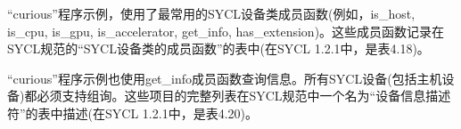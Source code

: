 “curious”程序示例，使用了最常用的SYCL设备类成员函数(例如，is\_host, is\_cpu, is\_gpu, is\_accelerator, get\_info, has\_extension)。这些成员函数记录在SYCL规范的“SYCL设备类的成员函数”的表中(在SYCL 1.2.1中，是表4.18)。\par

“curious”程序示例也使用get\_info成员函数查询信息。所有SYCL设备(包括主机设备)都必须支持组询。这些项目的完整列表在SYCL规范中一个名为“设备信息描述符”的表中描述(在SYCL 1.2.1中，是表4.20)。\par